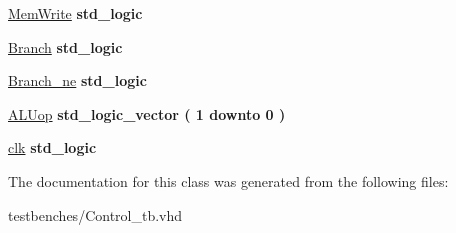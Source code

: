 \begin{DoxyCompactItemize}
\item 
\hypertarget{class_control__tb_1_1behavior_a8191975b14650422c32525035071f4a1}{\hyperlink{class_control__tb_1_1behavior_a8191975b14650422c32525035071f4a1}{\-Mem\-Write} {\bfseries std\-\_\-logic } }\label{class_control__tb_1_1behavior_a8191975b14650422c32525035071f4a1}

\item 
\hypertarget{class_control__tb_1_1behavior_a05b8fd1d32e431ac9f7ee10d7c94456b}{\hyperlink{class_control__tb_1_1behavior_a05b8fd1d32e431ac9f7ee10d7c94456b}{\-Branch} {\bfseries std\-\_\-logic } }\label{class_control__tb_1_1behavior_a05b8fd1d32e431ac9f7ee10d7c94456b}

\item 
\hypertarget{class_control__tb_1_1behavior_a43ed234a1ae58140bfdfd216edc7e186}{\hyperlink{class_control__tb_1_1behavior_a43ed234a1ae58140bfdfd216edc7e186}{\-Branch\-\_\-ne} {\bfseries std\-\_\-logic } }\label{class_control__tb_1_1behavior_a43ed234a1ae58140bfdfd216edc7e186}

\item 
\hypertarget{class_control__tb_1_1behavior_a5d65420da74b0a0059c439bac3a8a4e8}{\hyperlink{class_control__tb_1_1behavior_a5d65420da74b0a0059c439bac3a8a4e8}{\-A\-L\-Uop} {\bfseries std\-\_\-logic\-\_\-vector (   1    downto    0  ) } }\label{class_control__tb_1_1behavior_a5d65420da74b0a0059c439bac3a8a4e8}

\item 
\hypertarget{class_control__tb_1_1behavior_aca7354d71943883837f9a10b804a321f}{\hyperlink{class_control__tb_1_1behavior_aca7354d71943883837f9a10b804a321f}{clk} {\bfseries std\-\_\-logic } }\label{class_control__tb_1_1behavior_aca7354d71943883837f9a10b804a321f}

\end{DoxyCompactItemize}


\-The documentation for this class was generated from the following files\-:\begin{DoxyCompactItemize}
\item 
testbenches/\-Control\-\_\-tb.\-vhd\end{DoxyCompactItemize}
